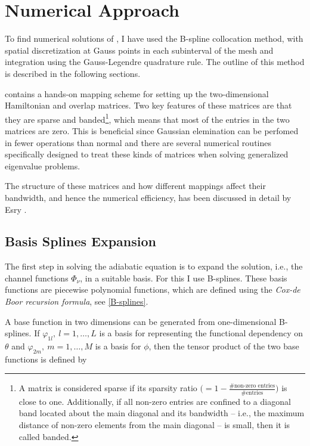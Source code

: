 \chapter{Numerical Approach}\label{chapter:5}
To find numerical solutions of , I have used the B-spline collocation method, with spatial discretization at Gauss points in each subinterval of the mesh and integration using the Gauss-Legendre quadrature rule. The outline of this method is described in the following sections. 

 contains a hands-on mapping scheme for setting up the two-dimensional Hamiltonian and overlap matrices. Two key features of these matrices are that they are sparse and banded\footnote{A matrix is considered sparse if its sparsity ratio $\big(=1 - \frac{\# \text{non-zero entries}}{\#\text{entries}}\big)$ is close to one. Additionally, if all non-zero entries are confined to a diagonal band located about the main diagonal and its bandwidth -- i.e., the maximum distance of non-zero elements from the main diagonal -- is small, then it is called banded.}, which means that most of the entries in the two matrices are zero. This is beneficial since Gaussian elemination can be perfomed in fewer operations than normal and there are several numerical routines specifically designed to treat these kinds of matrices when solving generalized eigenvalue problems. 

The structure of these matrices and how different mappings affect their bandwidth, and hence the numerical efficiency, has been discussed in detail by Esry \cite{Esry_thesis}.   

\section{Basis Splines Expansion}\label{section:BSexpansion}
The first step in solving the adiabatic equation is to expand the solution, i.e., the channel functions $\Phi_{\nu}$, in a suitable basis. For this I use B-splines. These basis functions are piecewise polynomial functions, which are defined using the \emph{Cox-de Boor recursion formula}, see \cref{B-splines}. 

A base function in two dimensions can be generated from one-dimensional B-splines. If $\varphi_{1l}, \ l= 1,\ldots,L$ is a basis for representing the functional dependency on $\theta$ and $\varphi_{2m}, \ m= 1,\ldots,M$ is a basis for $\phi$, then the tensor product of the two base functions is defined by


